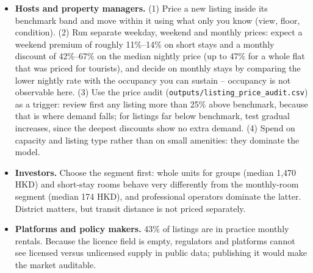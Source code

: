 \documentclass[10pt,a4paper]{article}
\begin{document}
\begin{itemize}[leftmargin=0.55cm,itemsep=2pt,topsep=2pt,parsep=0pt]
\item \textbf{Hosts and property managers.} (1) Price a new listing inside its benchmark band and move within it using what only you know (view, floor, condition). (2) Run separate weekday, weekend and monthly prices: expect a weekend premium of roughly 11\%--14\% on short stays and a monthly discount of 42\%--67\% on the median nightly price (up to 47\% for a whole flat that was priced for tourists), and decide on monthly stays by comparing the lower nightly rate with the occupancy you can sustain -- occupancy is not observable here. (3) Use the price audit (\texttt{outputs/listing\_price\_audit.csv}) as a trigger: review first any listing more than 25\% above benchmark, because that is where demand falls; for listings far below benchmark, test gradual increases, since the deepest discounts show no extra demand. (4) Spend on capacity and listing type rather than on small amenities: they dominate the model.
\item \textbf{Investors.} Choose the segment first: whole units for groups (median 1,470 HKD) and short-stay rooms behave very differently from the monthly-room segment (median 174 HKD), and professional operators dominate the latter. District matters, but transit distance is not priced separately.
\item \textbf{Platforms and policy makers.} 43\% of listings are in practice monthly rentals. Because the licence field is empty, regulators and platforms cannot see licensed versus unlicensed supply in public data; publishing it would make the market auditable.
\end{itemize}
\end{document}
